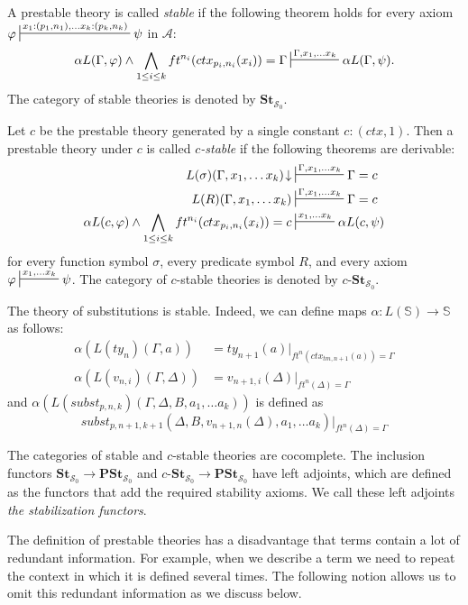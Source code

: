 \documentclass[reqno]{amsart}
\theoremstyle{definition}
\theoremstyle{remark}
\newcommand{\cat}[1]{\mathbf{#1}}
\newcommand{\substTh}{\mathbb{S}}
\newcommand{\St}{\cat{St}}
\newcommand{\PSt}{\cat{PSt}}
\newcommand{\cSt}[1][c]{#1\text{-}\St}
\numberwithin{figure}{section}
\begin{document}
\begin{defn}
A prestable theory is called \emph{stable} if the following theorem holds for every axiom $\varphi \sststile{}{x_1 : (p_1,n_1), \ldots x_k : (p_k,n_k)} \psi$ in $\mathcal{A}$:
\[ \alpha L(\Gamma,\varphi) \land \bigwedge_{1 \leq i \leq k} ft^{n_i}(ctx_{p_i,n_i}(x_i)) = \Gamma \sststile{}{\Gamma, x_1, \ldots x_k} \alpha L(\Gamma,\psi). \]
The category of stable theories is denoted by $\St_{\mathcal{S}_0}$.

Let $c$ be the prestable theory generated by a single constant $c : (ctx,1)$.
Then a prestable theory under $c$ is called \emph{$c$-stable} if the following theorems are derivable:
\begin{align*}
L(\sigma)(\Gamma, x_1, \ldots x_k)\!\downarrow & \sststile{}{\Gamma, x_1, \ldots x_k} \Gamma = c \\
L(R)(\Gamma, x_1, \ldots x_k) & \sststile{}{\Gamma, x_1, \ldots x_k} \Gamma = c \\
\alpha L(c,\varphi) \land \bigwedge_{1 \leq i \leq k} ft^{n_i}(ctx_{p_i,n_i}(x_i)) = c & \sststile{}{x_1, \ldots x_k} \alpha L(c,\psi)
\end{align*}
for every function symbol $\sigma$, every predicate symbol $R$, and every axiom $\varphi \sststile{}{x_1, \ldots x_k} \psi$.
The category of $c$-stable theories is denoted by $\cSt_{\mathcal{S}_0}$.
\end{defn}

The theory of substitutions is stable.
Indeed, we can define maps $\alpha : L(\substTh) \to \substTh$ as follows:
\begin{align*}
\alpha(L(ty_n)(\Gamma,a)) & = ty_{n+1}(a)|_{ft^n(ctx_{tm,n+1}(a)) = \Gamma} \\
\alpha(L(v_{n,i})(\Gamma,\Delta)) & = v_{n+1,i}(\Delta)|_{ft^n(\Delta) = \Gamma}
\end{align*}
and $\alpha(L(subst_{p,n,k})(\Gamma, \Delta, B, a_1, \ldots a_k))$ is defined as
\[ subst_{p,n+1,k+1}(\Delta, B, v_{n+1,n}(\Delta), a_1, \ldots a_k)|_{ft^n(\Delta) = \Gamma} \]

The categories of stable and $c$-stable theories are cocomplete.
The inclusion functors $\St_{\mathcal{S}_0} \to \PSt_{\mathcal{S}_0}$ and $\cSt_{\mathcal{S}_0} \to \PSt_{\mathcal{S}_0}$ have left adjoints,
which are defined as the functors that add the required stability axioms.
We call these left adjoints \emph{the stabilization functors}.

The definition of prestable theories has a disadvantage that terms contain a lot of redundant information.
For example, when we describe a term we need to repeat the context in which it is defined several times.
The following notion allows us to omit this redundant information as we discuss below.
\end{document}

